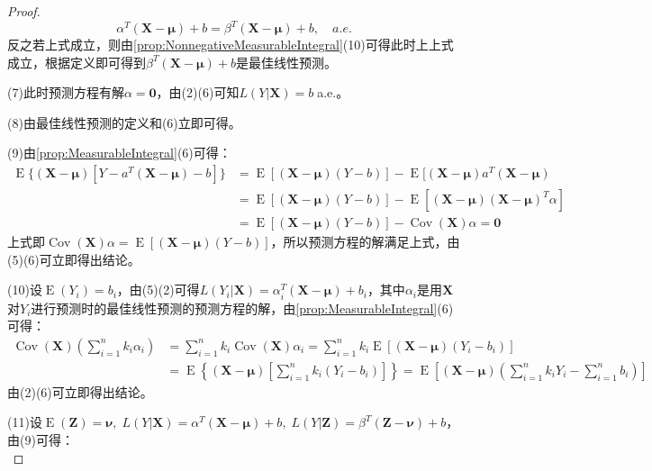 \begin{proof}
	\begin{equation*}
		\alpha^T(\mathbf{X}-\boldsymbol{\mu})+b=\beta^T(\mathbf{X}-\boldsymbol{\mu})+b,\quad a.e.
	\end{equation*}
	反之若上式成立，则由\cref{prop:NonnegativeMeasurableIntegral}(10)可得此时上上式成立，根据定义即可得到$\beta^T(\mathbf{X}-\boldsymbol{\mu})+b$是最佳线性预测。\par
	(7)此时预测方程有解$\alpha=\mathbf{0}$，由(2)(6)可知$L(Y|\mathbf{X})=b\;$a.e.。\par
	(8)由最佳线性预测的定义和(6)立即可得。\par
	(9)由\cref{prop:MeasurableIntegral}(6)可得：
	\begin{align*}
		\operatorname{E}\{(\mathbf{X}-\boldsymbol{\mu})[Y-a^T(\mathbf{X}-\boldsymbol{\mu})-b]\}&=\operatorname{E}[(\mathbf{X}-\boldsymbol{\mu})(Y-b)]-\operatorname{E}[(\mathbf{X}-\boldsymbol{\mu})a^T(\mathbf{X}-\boldsymbol{\mu}) \\
		&=\operatorname{E}[(\mathbf{X}-\boldsymbol{\mu})(Y-b)]-\operatorname{E}[(\mathbf{X}-\boldsymbol{\mu})(\mathbf{X}-\boldsymbol{\mu})^T\alpha] \\
		&=\operatorname{E}[(\mathbf{X}-\boldsymbol{\mu})(Y-b)]-\operatorname{Cov}(\mathbf{X})\alpha=\mathbf{0}
	\end{align*}
	上式即$\operatorname{Cov}(\mathbf{X})\alpha=\operatorname{E}[(\mathbf{X}-\boldsymbol{\mu})(Y-b)]$，所以预测方程的解满足上式，由(5)(6)可立即得出结论。\par
	(10)设$\operatorname{E}(Y_i)=b_i$，由(5)(2)可得$L(Y_i|\mathbf{X})=\alpha_i^T(\mathbf{X}-\boldsymbol{\mu})+b_i$，其中$\alpha_i$是用$\mathbf{X}$对$Y_i$进行预测时的最佳线性预测的预测方程的解，由\cref{prop:MeasurableIntegral}(6)可得：
	\begin{align*}
		\operatorname{Cov}(\mathbf{X})\left(\sum_{i=1}^{n}k_i\alpha_i\right)&=\sum_{i=1}^{n}k_i\operatorname{Cov}(\mathbf{X})\alpha_i=\sum_{i=1}^{n}k_i\operatorname{E}[(\mathbf{X}-\boldsymbol{\mu})(Y_i-b_i)] \\
		&=\operatorname{E}\left\{(\mathbf{X}-\boldsymbol{\mu})\left[\sum_{i=1}^{n}k_i(Y_i-b_i)\right]\right\} =\operatorname{E}\left[(\mathbf{X}-\boldsymbol{\mu})\left(\sum_{i=1}^{n}k_iY_i-\sum_{i=1}^{n}b_i\right)\right]
	\end{align*}
	由(2)(6)可立即得出结论。\par
	(11)设$\operatorname{E}(\mathbf{Z})=\boldsymbol{\nu},\;L(Y|\mathbf{X})=\alpha^T(\mathbf{X}-\boldsymbol{\mu})+b,\;L(Y|\mathbf{Z})=\beta^T(\mathbf{Z}-\boldsymbol{\nu})+b$，由(9)可得：
	\begin{equation*}

\end{equation*}
\end{proof}
